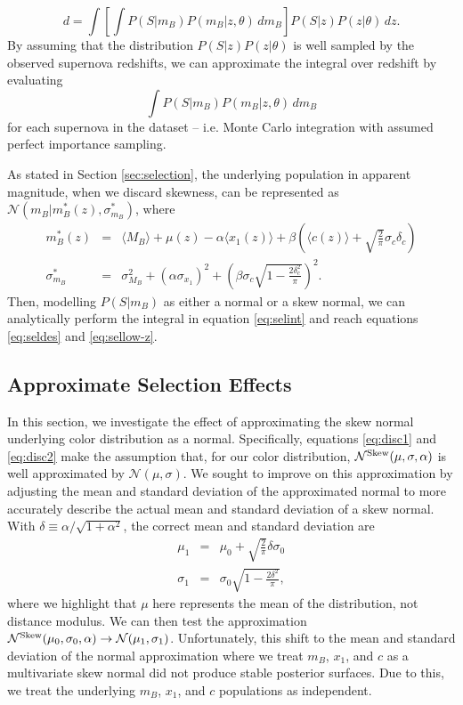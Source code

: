 \documentclass[twocolumn,trackchanges,tighten]{aastex62}
\begin{document}
\begin{equation}
d = \int \left[ \int P(S|m_B) P(m_B | z, \theta)\, dm_B \right] P(S|z)P(z|\theta)\, dz.
\end{equation}
By assuming that the distribution $P(S|z)P(z|\theta)$ is well sampled by the observed supernova redshifts, we can approximate the integral over redshift by evaluating
\begin{equation}
\int P(S|m_B) P(m_B | z, \theta)\, dm_B \label{eq:selint}
\end{equation}
for each supernova in the dataset -- i.e. Monte Carlo integration with assumed perfect importance sampling.

As stated in Section \ref{sec:selection}, the underlying population in apparent magnitude, when we discard skewness, can be represented as $\mathcal{N}(m_B|m_B^*(z), \sigma^*_{m_B})$, where
\begin{eqnarray}
m_B^*(z) &=& \langle M_B \rangle + \mu(z) - \alpha \langle x_1(z) \rangle + \beta \left(\langle c(z) \rangle + \sqrt{\frac{2}{\pi}}\sigma_c \delta_c\right)\label{eq:disc1} \\
\sigma^*_{m_B} &=& \sigma_{M_B}^2 + (\alpha \sigma_{x_1})^2 +  \left(\beta \sigma_c \sqrt{1 - \frac{2\delta_c^2}{\pi}}\right)^2. \label{eq:disc2}
\end{eqnarray}
Then, modelling $P(S|m_B)$ as either a normal or a skew normal, we can analytically perform the integral in equation \eqref{eq:selint} and reach equations \eqref{eq:seldes} and \eqref{eq:sellow-z}.





\subsection{Approximate Selection Effects}
\label{app:approx}

In this section, we investigate the effect of approximating the skew normal underlying color distribution as a normal. Specifically, equations \eqref{eq:disc1} and \eqref{eq:disc2} make the assumption that, for our color distribution, $\mathcal{N}^{\rm Skew}(\mu, \sigma, \alpha)$ is well approximated by $\mathcal{N}(\mu, \sigma)$. We sought to improve on this approximation by adjusting the mean and standard deviation of the approximated normal to more accurately describe the actual mean and standard deviation of a skew normal. With $\delta \equiv \alpha/\sqrt{1+\alpha^2}$, the correct mean and standard deviation are
\begin{eqnarray}
\mu_1 &=& \mu_0 + \sqrt{\frac{2}{\pi}} \delta \sigma_0 \\
\sigma_1 &=& \sigma_0 \sqrt{1 - \frac{2 \delta^2}{\pi}},
\end{eqnarray}
where we highlight that $\mu$ here represents the mean of the distribution, not distance modulus. We can then test the approximation $\mathcal{N}^{\rm Skew}(\mu_0, \sigma_0, \alpha) \rightarrow \mathcal{N}(\mu_1, \sigma_1)$. Unfortunately, this shift to the mean and standard deviation of the normal approximation where we treat $m_B$, $x_1$, and $c$ as a multivariate skew normal did not produce stable posterior surfaces. Due to this, we treat the underlying $m_B$, $x_1$, and $c$ populations as independent. 
\end{document}

